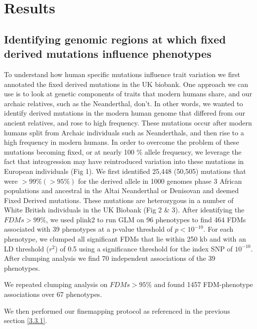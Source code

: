 \section{Results}
\subsection{Identifying genomic regions at which fixed derived mutations influence phenotypes}
To understand how human specific mutations influence trait variation we first annotated the fixed derived mutations in the UK biobank. One approach we can use is to look at genetic components of traits that modern humans share, and our archaic relatives, such as the Neanderthal, don’t. In other words, we wanted to identify derived mutations in the modern human genome that differed from our ancient relatives, and rose to high frequency. These mutations occur after modern humans split from Archaic individuals such as Neanderthals, and then rise to a high frequency in modern humans. In order to overcome the problem of these mutations becoming fixed, or at nearly 100 \% allele frequency, we leverage the fact that introgression may have reintroduced variation into these mutations in European individuals (Fig 1). We first identified  25,448 (50,505) mutations that were $>99\% (>95\%)$ for the derived allele in 1000 genomes phase 3 African populations and ancestral in the Altai Neanderthal or Denisovan and deemed Fixed Derived mutations. These mutations are heterozygous in a number of White British individuals in the UK Biobank (Fig 2 \& 3). After identifying the $FDMs >99\%$, we used plink2 to run GLM on 96 phenotypes to find 464 FDMs associated with 39 phenotypes at a p-value threshold of $p<10^{-10}$.  For each phenotype, we clumped all significant FDMs that lie within 250 kb and with an LD threshold ($r^2$) of 0.5 using a significance threshold for the index SNP of $10^{-10}$. After clumping analysis we find 70 independent associations of the 39 phenotypes.

We repeated clumping analysis on $FDMs > 95\%$ and found 1457 FDM-phenotype associations over 67 phenotypes. 

We then performed our finemapping protocol as referenced in the previous section \ref{3.3.1}. 
